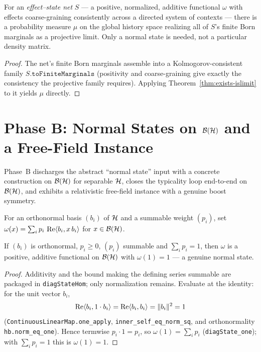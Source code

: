 \begin{theorem}
  \label{thm:exists-typicality}
  \leanok
  For an \emph{effect--state net} $S$ --- a positive, normalized, additive functional
  $\omega$ with effects coarse-graining consistently across a directed system of
  contexts --- there is a probability measure $\mu$ on the global history space
  realizing all of $S$'s finite Born marginals as a projective limit. Only a normal
  state is needed, not a particular density matrix.
\end{theorem}

\begin{proof}
  \leanok
  The net's finite Born marginals assemble into a Kolmogorov-consistent family
  $S.\texttt{toFiniteMarginals}$ (positivity and coarse-graining give exactly the
  consistency the projective family requires). Applying
  Theorem~\ref{thm:exists-islimit} to it yields $\mu$ directly.
\end{proof}


\chapter{Phase B: Normal States on $\mathcal{B}(\mathcal{H})$ and a Free-Field Instance}
\label{chap:phaseB}

Phase~B discharges the abstract ``normal state'' input with a concrete construction
on $\mathcal{B}(\mathcal{H})$ for separable $\mathcal{H}$, closes the typicality loop end-to-end on $\mathcal{B}(\mathcal{H})$, and
exhibits a relativistic free-field instance with a genuine boost symmetry.

\begin{definition}
  \label{def:diag-state}
  For an orthonormal basis $(b_i)$ of $\mathcal{H}$ and a summable weight $(p_i)$, set
  $\omega(x) = \sum_i p_i\,\operatorname{Re}\langle b_i, x\,b_i\rangle$ for $x \in \mathcal{B}(\mathcal{H})$.
\end{definition}

\begin{theorem}
  \label{thm:normal-state}
  \leanok
  If $(b_i)$ is orthonormal, $p_i \ge 0$, $(p_i)$ summable and $\sum_i p_i = 1$, then
  $\omega$ is a positive, additive functional on $\mathcal{B}(\mathcal{H})$ with $\omega(1) = 1$ --- a
  genuine normal state.
\end{theorem}

\begin{proof}
  \leanok
  Additivity and the bound making the defining series summable are packaged in
  \texttt{diagStateHom}; only normalization remains. Evaluate at the identity: for the
  unit vector $b_i$,
  \[
    \operatorname{Re}\langle b_i, 1\cdot b_i\rangle = \operatorname{Re}\langle b_i, b_i\rangle = \|b_i\|^2 = 1
  \]
  (\texttt{ContinuousLinearMap.one\_apply}, \texttt{inner\_self\_eq\_norm\_sq}, and
  orthonormality \texttt{hb.norm\_eq\_one}). Hence termwise $p_i \cdot 1 = p_i$, so
  $\omega(1) = \sum_i p_i$ (\texttt{diagState\_one}); with $\sum_i p_i = 1$ this is
  $\omega(1) = 1$.
\end{proof}

